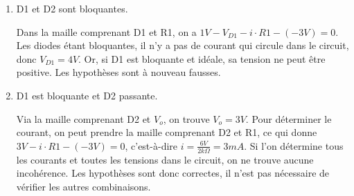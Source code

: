 \documentclass{../template/tp}
\begin{document}
{\begin{enumerate}
    \item D1 et D2 sont bloquantes.

    Dans la maille comprenant D1 et R1, on a $1V - V_{D1} - i \cdot R1 - (-3V) = 0$.
    Les diodes étant bloquantes, il n'y a pas de courant qui circule dans le circuit, donc $V_{D1} = 4V$.
    Or, si D1 est bloquante et idéale, sa tension ne peut être positive.
    Les hypothèses sont à nouveau fausses.

    \item D1 est bloquante et D2 passante.

    Via la maille comprenant D2 et $V_o$, on trouve $V_o = 3V$.
    Pour déterminer le courant, on peut prendre la maille comprenant D2 et R1, ce qui donne $3V - i \cdot R1 - (-3V) = 0$, c'est-à-dire $i = \frac{6V}{2k\Omega} = 3mA$.
    Si l'on détermine tous les courants et toutes les tensions dans le circuit, on ne trouve aucune incohérence.
    Les hypothèses sont donc correctes, il n'est pas nécessaire de vérifier les autres combinaisons.
\end{enumerate}
}
\end{document}
